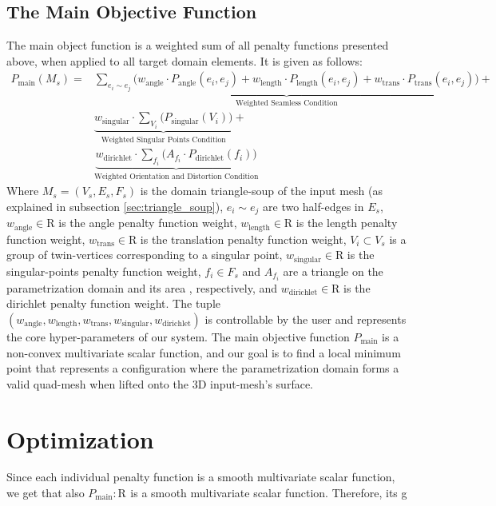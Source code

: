 \subsection{The Main Objective Function}
The main object function is a weighted sum of all penalty functions presented above, when applied to all target domain elements. It is given as follows:
\begin{equation}\label{eq:main_objective_function}
\begin{split}
P_{\mathrm{main}}\left(M_s\right) = &\underbrace{\sum_{e_i \sim e_j} \Big(w_{\mathrm{angle}} \cdot P_{\mathrm{angle}}\left(e_i,e_j\right) + w_{\mathrm{length}} \cdot P_{\mathrm{length}}\left(e_i,e_j\right) + w_{\mathrm{trans}} \cdot P_{\mathrm{trans}}\left(e_i,e_j\right)\Big)}_{\text{Weighted Seamless Condition}} + \\
&\underbrace{w_{\mathrm{singular}} \cdot \sum_{V_i} \Big(P_{\mathrm{singular}}\left(V_i\right)\Big)}_{\text{Weighted Singular Points Condition}} +
\\
&\underbrace{w_{\mathrm{dirichlet}} \cdot \sum_{f_i} \Big(A_{f_i} \cdot P_{\mathrm{dirichlet}}\left(f_i\right)\Big)}_{\text{Weighted Orientation and Distortion Condition}}
\end{split}
\end{equation}
Where $M_s = \left(V_s, E_s, F_s\right)$ is the domain triangle-soup of the input mesh (as explained in subsection \ref{sec:triangle_soup}), $e_i \sim e_j$ are two half-edges in $E_s$, $w_{\mathrm{angle}} \in \mathrm{R}$ is the angle penalty function weight, $w_{\mathrm{length}} \in \mathrm{R}$ is the length penalty function weight, $w_{\mathrm{trans}} \in \mathrm{R}$ is the translation penalty function weight, $V_i \subset V_s$ is a group of twin-vertices corresponding to a singular point, $w_{\mathrm{singular}} \in \mathrm{R}$ is the singular-points penalty function weight, $f_i \in F_s$ and $A_{f_i}$ are a triangle on the parametrization domain and its area , respectively, and $w_{\mathrm{dirichlet}} \in \mathrm{R}$ is the dirichlet penalty function weight. The tuple $\left(w_{\mathrm{angle}}, w_{\mathrm{length}}, w_{\mathrm{trans}}, w_{\mathrm{singular}}, w_{\mathrm{dirichlet}}\right)$ is controllable by the user and represents the core hyper-parameters of our system. The main objective function $P_{\mathrm{main}}$ is a non-convex multivariate scalar function, and our goal is to find a local minimum point that represents a configuration where the parametrization domain forms a valid quad-mesh when lifted onto the 3D input-mesh's surface.
\section{Optimization}
Since each individual penalty function is a smooth multivariate scalar function, we get that also $P_{\mathrm{main}}: \mathrm{R}^{}$ is a smooth multivariate scalar function. Therefore, its g